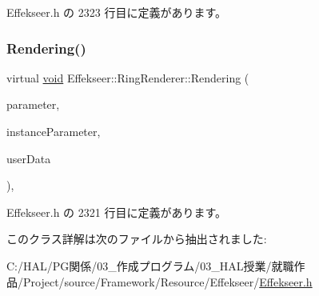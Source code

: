  Effekseer.\+h の 2323 行目に定義があります。

\mbox{\label{class_effekseer_1_1_ring_renderer_ac43fd38e8d1dc8c8916518a6e4ed6c22}} 
\subsubsection{\texorpdfstring{Rendering()}{Rendering()}}
{\footnotesize\ttfamily virtual \mbox{\hyperlink{namespace_effekseer_ab34c4088e512200cf4c2716f168deb56}{void}} Effekseer\+::\+Ring\+Renderer\+::\+Rendering (\begin{DoxyParamCaption}\item[{const \mbox{\hyperlink{struct_effekseer_1_1_ring_renderer_1_1_node_parameter}{Node\+Parameter}} \&}]{parameter,  }\item[{const \mbox{\hyperlink{struct_effekseer_1_1_ring_renderer_1_1_instance_parameter}{Instance\+Parameter}} \&}]{instance\+Parameter,  }\item[{\mbox{\hyperlink{namespace_effekseer_ab34c4088e512200cf4c2716f168deb56}{void}} $\ast$}]{user\+Data }\end{DoxyParamCaption})\hspace{0.3cm}{\ttfamily [inline]}, {\ttfamily [virtual]}}



 Effekseer.\+h の 2321 行目に定義があります。



このクラス詳解は次のファイルから抽出されました\+:\begin{DoxyCompactItemize}
\item 
C\+:/\+H\+A\+L/\+P\+G関係/03\+\_\+作成プログラム/03\+\_\+\+H\+A\+L授業/就職作品/\+Project/source/\+Framework/\+Resource/\+Effekseer/\mbox{\hyperlink{_effekseer_8h}{Effekseer.\+h}}\end{DoxyCompactItemize}
